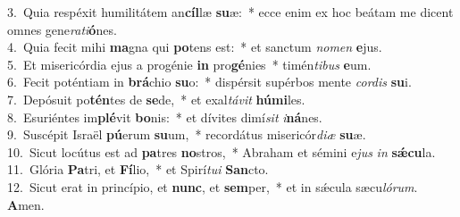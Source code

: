 {3.~}Quia respéxit humilitátem an\textbf{cíl}læ \textbf{su}æ:~* ecce enim ex hoc beátam me dicent omnes gene\textit{ra}\textit{ti}\textbf{ó}nes.\\
{4.~}Quia fecit mihi \textbf{ma}gna qui \textbf{po}tens est:~* et sanctum \textit{no}\textit{men} \textbf{e}jus.\\
{5.~}Et misericórdia ejus a progénie \textbf{in} pro\textbf{gé}nies~* timén\textit{ti}\textit{bus} \textbf{e}um.\\
{6.~}Fecit poténtiam in \textbf{brá}chio \textbf{su}o:~* dispérsit supérbos mente \textit{cor}\textit{dis} \textbf{su}i.\\
{7.~}Depósuit po\textbf{tén}tes de \textbf{se}de,~* et exal\textit{tá}\textit{vit} \textbf{hú}\textbf{mi}les.\\
{8.~}Esuriéntes im\textbf{plé}vit \textbf{bo}nis:~* et dívites dimí\textit{sit} \textit{i}\textbf{ná}nes.\\
{9.~}Suscépit Israël \textbf{pú}erum \textbf{su}um,~* recordátus misericór\textit{di}\textit{æ} \textbf{su}æ.\\
{10.~}Sicut locútus est ad \textbf{pa}tres \textbf{no}stros,~* Abraham et sémini e\textit{jus} \textit{in} \textbf{sǽ}\textbf{cu}la.\\
{11.~}Glória \textbf{Pa}tri, et \textbf{Fí}lio,~* et Spirí\textit{tu}\textit{i} \textbf{San}cto.\\
{12.~}Sicut erat in princípio, et \textbf{nunc}, et \textbf{sem}per,~* et in sǽcula sæcu\textit{ló}\textit{rum}. \textbf{A}men.\\
